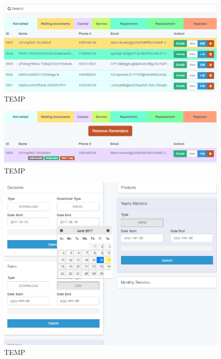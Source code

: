 	\begin{figure}
		\includegraphics[width=\linewidth]{../imagini/claims_normal.png}
		\caption{TEMP}
		\label{fig:TEMP}
	\end{figure}
	\begin{figure}
		\includegraphics[width=\linewidth]{../imagini/claims_reminder_view.png}
		\caption{TEMP}
		\label{fig:TEMP}
	\end{figure}
	\begin{figure}
		\includegraphics[width=\linewidth]{../imagini/claims_reports.png}
		\caption{TEMP}
		\label{fig:TEMP}
	\end{figure}
